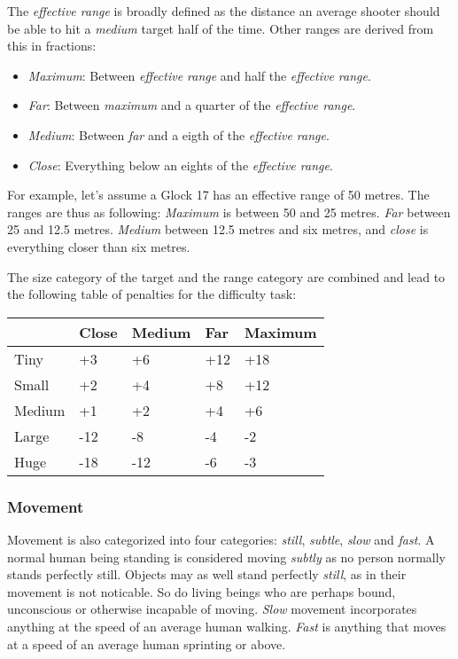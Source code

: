 The \emph{effective range} is broadly defined as the distance an average shooter
should be able to hit a \emph{medium} target half of the time. Other ranges are
derived from this in fractions:

\begin{itemize}
\item \emph{Maximum}: Between \emph{effective range} and half the
  \emph{effective range}.
\item \emph{Far}: Between \emph{maximum} and a quarter of the
  \emph{effective range}.
\item \emph{Medium}: Between \emph{far} and a eigth of the
  \emph{effective range}.
\item \emph{Close}: Everything below an eights of the \emph{effective range}.
\end{itemize}

For example, let's assume a Glock 17 has an effective range of 50
metres. The ranges are thus as following: \emph{Maximum} is between 50
and 25 metres. \emph{Far} between 25 and 12.5 metres. \emph{Medium}
between 12.5 metres and six metres, and \emph{close} is everything
closer than six metres.

The size category of the target and the range category are combined and lead
to the following table of penalties for the difficulty task:

\begin{center}
  \begin{tabular}{| l | l | l | l | l |}
    \hline
    \,        & Close & Medium & Far & Maximum \\ \hline
    Tiny      & +3    & +6     & +12 & +18    \\ \hline
    Small     & +2    & +4     & +8  & +12    \\ \hline
    Medium    & +1    & +2     & +4  & +6     \\ \hline
    Large     & -12   & -8     & -4  & -2     \\ \hline
    Huge      & -18   & -12    & -6  & -3     \\
    \hline
  \end{tabular}
\end{center}

\subsubsection{Movement}
\label{subs:7-Movement}

Movement is also categorized into four categories: \emph{still}, \emph{subtle},
\emph{slow} and \emph{fast}. A normal human being standing is considered
moving \emph{subtly} as no person normally stands perfectly still. Objects
may as well stand perfectly \emph{still}, as in their movement is not
noticable. So do living beings who are perhaps bound, unconscious or otherwise
incapable of moving. \emph{Slow} movement incorporates anything at the speed
of an average human walking. \emph{Fast} is anything that moves at a speed of
an average human sprinting or above.

